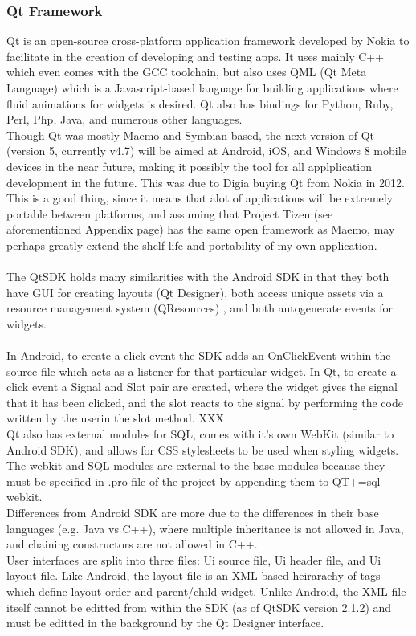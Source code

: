 \subsubsection{Qt Framework} 
Qt is an open-source cross-platform application framework developed by Nokia to facilitate in the creation of developing and testing apps.  It uses mainly C++ which even comes with the GCC toolchain, but also uses QML (Qt Meta Language) which is a Javascript-based language for building applications where fluid animations for widgets is desired. Qt also has bindings for Python, Ruby, Perl, Php, Java, and numerous other languages.\\

Though Qt was mostly Maemo and Symbian based, the next version of Qt (version 5, currently v4.7) will be aimed at Android, iOS, and Windows 8 mobile devices in the near future, making it possibly the tool for all applplication development in the future. This was due to Digia buying Qt from Nokia in 2012\cite{nokiasell}. This is a good thing, since it means that alot of applications will be extremely portable between platforms, and assuming that Project Tizen (see aforementioned Appendix page) has the same open framework as Maemo, may perhaps greatly extend the shelf life and portability of my own application.\\

\hspace{-20pt}{\bf Qt SDK}\\
The QtSDK holds many similarities with the Android SDK in that they both have GUI for creating layouts (Qt Designer), both access unique assets via a resource management system (QResources) , and both autogenerate events for widgets.\\

\hspace{-20pt}{\bf Android vs Qt}\\
In Android, to create a click event the SDK adds an OnClickEvent within the source file which acts as a listener for that particular widget. In Qt, to create a click event a Signal and Slot pair are created, where the widget gives the signal that it has been clicked, and the slot reacts to the signal by performing the code written by the userin the slot method. XXX
\\
Qt also has external modules for SQL, comes with it's own WebKit (similar to Android SDK), and allows for CSS stylesheets to be used when styling widgets. The webkit and SQL modules are external to the base modules because they must be specified in .pro file of the project by appending them to QT+=sql webkit.
\\
Differences from Android SDK are more due to the differences in their base languages (e.g. Java vs C++), where multiple inheritance is not allowed in Java, and chaining constructors are not allowed in C++.\\
User interfaces are split into three files: Ui source file, Ui header file, and Ui layout file. Like Android, the layout file is an XML-based heirarachy of tags which define layout order and parent/child widget. Unlike Android, the XML file itself cannot be editted from within the SDK (as of QtSDK version 2.1.2) and must be editted in the background by the Qt Designer interface.

